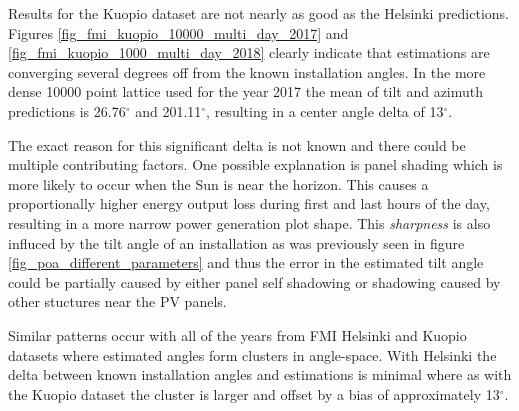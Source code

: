 Results for the Kuopio dataset are not nearly as good as the Helsinki predictions. Figures \ref{fig_fmi_kuopio_10000_multi_day_2017} and \ref{fig_fmi_kuopio_1000_multi_day_2018} clearly indicate that estimations are converging several degrees off from the known installation angles. In the more dense 10000 point lattice used for the year 2017 the mean of tilt and azimuth predictions is 26.76$^\circ$ and 201.11$^\circ$, resulting in a center angle delta of 13$^\circ$. 

The exact reason for this significant delta is not known and there could be multiple contributing factors. One possible explanation is panel shading which is more likely to occur when the Sun is near the horizon. This causes a proportionally higher energy output loss during first and last hours of the day, resulting in a more narrow power generation plot shape. This \textit{sharpness} is also influced by the tilt angle of an installation as was previously seen in figure \ref{fig_poa_different_parameters} and thus the error in the estimated tilt angle could be partially caused by either panel self shadowing or shadowing caused by other stuctures near the PV panels.

Similar patterns occur with all of the years from FMI Helsinki and Kuopio datasets where estimated angles form clusters in angle-space. With Helsinki the delta between known installation angles and estimations is minimal where as with the Kuopio dataset the cluster is larger and offset by a bias of approximately 13$^\circ$.



